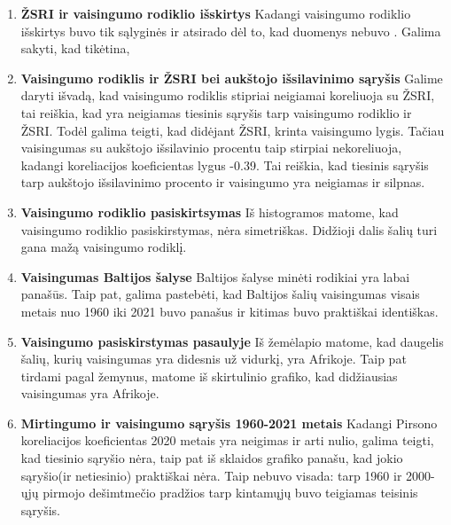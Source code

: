 \begin{enumerate}
    \item \textbf{ŽSRI ir vaisingumo rodiklio išskirtys}
    Kadangi vaisingumo rodiklio išskirtys buvo tik sąlyginės ir atsirado dėl to, kad duomenys nebuvo . Galima sakyti, kad tikėtina, 

    \item \textbf{Vaisingumo rodiklis ir ŽSRI bei aukštojo išsilavinimo sąryšis}
    Galime daryti išvadą, kad vaisingumo rodiklis stipriai neigiamai koreliuoja su ŽSRI, tai reiškia, kad yra neigiamas tiesinis sąryšis tarp vaisingumo rodiklio ir ŽSRI. Todėl galima teigti, kad didėjant ŽSRI, krinta vaisingumo lygis.
    Tačiau vaisingumas su aukštojo išsilavinio procentu taip stirpiai nekoreliuoja, kadangi koreliacijos koeficientas lygus -0.39. Tai reiškia, kad tiesinis sąryšis tarp aukštojo išsilavinimo procento ir vaisingumo yra neigiamas ir silpnas.

    \item \textbf{Vaisingumo rodiklio pasiskirtsymas}
    Iš histogramos matome, kad vaisingumo rodiklio pasiskirstymas, nėra simetriškas. Didžioji dalis šalių turi gana mažą vaisingumo rodiklį. 

    \item \textbf{Vaisingumas Baltijos šalyse}
    Baltijos šalyse minėti rodikiai yra labai panašūs. Taip pat, galima pastebėti, kad Baltijos šalių vaisingumas visais metais nuo 1960 iki 2021 buvo panašus ir kitimas buvo praktiškai identiškas.

    \item \textbf{Vaisingumo pasiskirstymas pasaulyje}
    Iš žemėlapio matome, kad daugelis šalių, kurių vaisingumas yra didesnis už vidurkį, yra Afrikoje.
    Taip pat tirdami pagal žemynus, matome iš skirtulinio grafiko, kad didžiausias vaisingumas yra Afrikoje.

    \item \textbf{Mirtingumo ir vaisingumo sąryšis 1960-2021 metais}
    Kadangi Pirsono koreliacijos koeficientas 2020 metais yra neigimas ir arti nulio, galima teigti, kad tiesinio sąryšio nėra, taip pat iš sklaidos grafiko panašu, kad jokio sąryšio(ir netiesinio) praktiškai nėra. Taip nebuvo visada: tarp 1960 ir 2000-ųjų pirmojo dešimtmečio pradžios tarp kintamųjų buvo teigiamas teisinis sąryšis.
\end{enumerate}
